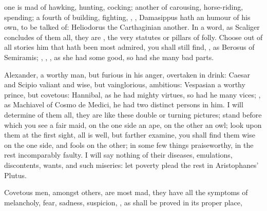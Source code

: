 
one is mad of hawking, hunting, cocking; another of
carousing, horse-riding, spending; a fourth of building, fighting, \etc{},
, Damasippus hath an humour of
his own, to be talked of: Heliodorus the Carthaginian
another. In a word, as Scaliger concludes of them all, they are , the very statutes or pillars of folly. Choose out of all
stories him that hath been most admired, you shall still find, , as Berosus of
Semiramis; , \etc{}, , as she had some good, so had she
many bad parts.

Alexander, a worthy man, but furious in his anger, overtaken in drink: Caesar
and Scipio valiant and wise, but vainglorious, ambitious: Vespasian a worthy
prince, but covetous: Hannibal, as he had mighty virtues,
so had he many vices; , as Machiavel
of Cosmo de Medici, he had two distinct persons in him. I will determine of
them all, they are like these double or turning pictures; stand before which
you see a fair maid, on the one side an ape, on the other an owl; look upon
them at the first sight, all is well, but farther examine, you shall find them
wise on the one side, and fools on the other; in some few things praiseworthy,
in the rest incomparably faulty. I will say nothing of their diseases,
emulations, discontents, wants, and such miseries: let poverty plead the rest
in Aristophanes' Plutus.

Covetous men, amongst others, are most mad, they have all
the symptoms of melancholy, fear, sadness, suspicion, \etc{}, as shall be
proved in its proper place,

